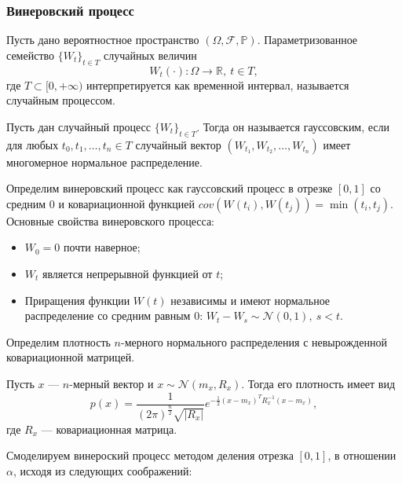 \documentclass[11pt]{article}
\begin{document}
\subsubsection{Винеровский процесс}
\begin{opr}
	Пусть дано вероятностное пространство $(\Omega, \mathcal{F},\mathbb{P}).$ Параметризованное семейство $\{ W_t \}_{t \in T}$ случайных величин
	\[ W_t(\cdot): \Omega \rightarrow \mathbb{R}, \ t\in T, \]
	где $T \subset [0,+\infty)$ интерпретируется как временной интервал, называется случайным процессом.
\end{opr}
\begin{opr}
	Пусть дан случайный процесс $\{W_t \}_{t \in T}$. Тогда он называется гауссовским, если для любых $t_0,t_1,\dots,t_n \in T$ случайный вектор $(W_{t_1},W_{t_2},\dots, W_{t_n})$ имеет многомерное нормальное распределение.
\end{opr}
Определим винеровский процесс как гауссовский процесс в отрезке $[0,1]$ со средним 0 и ковариационной функцией $cov(W(t_i),W(t_j)) = \min (t_i,t_j).$\\
Основные свойства винеровского процесса:
\begin{itemize}
	\item $W_0 = 0$ почти наверное;
	\item $W_t$ является непрерывной функцией от $t$;
	\item Приращения функции $W(t)$ независимы и имеют нормальное распределение со средним равным 0: $W_t - W_s \sim \mathcal{N}(0,1), \ s < t.$
\end{itemize}
Определим плотность $n$-мерного нормального распределения с невырожденной ковариационной матрицей.
\begin{opr}
	Пусть $x$ --- $n$-мерный вектор и $x \sim \mathcal{N}(m_x,R_x)$. Тогда его плотность имеет вид
	\[ p(x) = \frac{1}{(2\pi)^{\frac{n}{2}}\sqrt{|R_x|}}e^{-\frac{1}{2}(x - m_x)^TR_x^{-1}(x - m_x)}, \]
	где $R_x$ --- ковариационная матрица.
\end{opr}
Смоделируем винероский процесс методом деления отрезка $[0,1]$, в отношении $\alpha$, исходя из следующих соображений:
\end{document}
